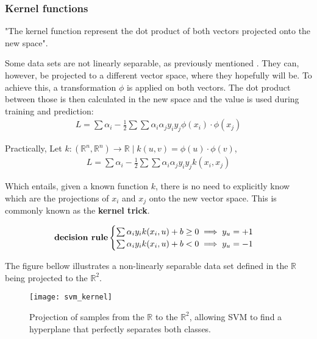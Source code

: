 \subsubsection{Kernel functions}

"The kernel function represent the dot product of both vectors projected onto the new space". \cite{mitsvm}

Some data sets are not linearly separable, as previously mentioned	. They can, however, be projected to a different vector space, where they hopefully will be. To achieve this, a transformation $\phi$ is applied on both vectors. The dot product between those is then calculated in the new space and the value is used during training and prediction:
\begin{gather*}
L = \sum\alpha_i -\frac{1}{2}\sum\sum\alpha_i\alpha_j y_i y_j \phi(x_i) \cdot \phi(x_j)
\end{gather*}

\begin{remark}
	Practically, Let $k: (\mathbb{R}^n, \mathbb{R}^n) \rightarrow \mathbb{R} \mid k(u, v) = \phi(u) \cdot \phi(v)$,
	\begin{gather*}
	L = \sum\alpha_i -\frac{1}{2}\sum\sum\alpha_i\alpha_j y_i y_j k(x_i, x_j)
	\end{gather*}

	Which entails, given a known function $k$, there is no need to explicitly know which are the projections of $x_i$ and $x_j$ onto the new vector space. This is commonly known as the \textbf{kernel trick}.
\end{remark}

$$\text{\textbf{decision rule}} \begin{cases}
\sum\alpha_i y_i k(x_i, u) +b \geq 0 \implies y_u=+1\\
\sum\alpha_i y_i k(x_i, u) +b < 0 \implies y_u=-1\\
\end{cases}$$

The figure bellow illustrates a non-linearly separable data set defined in the $\mathbb{R}$ being projected to the $\mathbb{R}^2$.

\begin{figure}[H]
	\centering
	\captionsetup{justification=centering}

	\texttt{[image: svm\_kernel]}
	\caption{Projection of samples from the $\mathbb{R}$ to the $\mathbb{R}^2$, allowing SVM to find a hyperplane that perfectly separates both classes. \cite{svmkernels}}
	\label{fig:svmkernel}
\end{figure}


